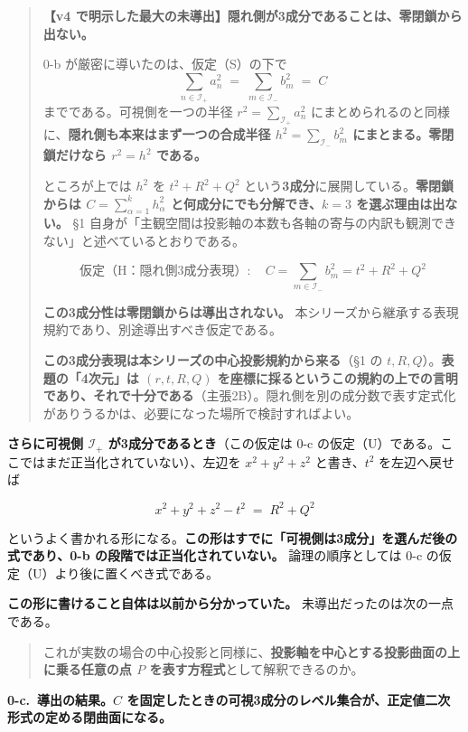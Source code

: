 \documentclass[
  10pt,
]{ltjsarticle}
\begin{document}
\begin{quote}
\textbf{【v4
で明示した最大の未導出】隠れ側が3成分であることは、零閉鎖から出ない。}

0-b が厳密に導いたのは、仮定（S）の下で
\[\sum_{n\in\mathcal{I}_+}a_n^2 \;=\; \sum_{m\in\mathcal{I}_-}b_m^2 \;=\; C\]
までである。可視側を一つの半径 \(r^2 = \sum_{\mathcal{I}_+}a_n^2\)
にまとめられるのと同様に、\textbf{隠れ側も本来はまず一つの合成半径
\(h^2 = \sum_{\mathcal{I}_-}b_m^2\) にまとまる。零閉鎖だけなら
\(r^2 = h^2\) である。}

ところが上では \(h^2\) を \(t^2+R^2+Q^2\)
という\textbf{3成分}に展開している。\textbf{零閉鎖からは
\(C = \sum_{\alpha=1}^{k}h_\alpha^2\) と何成分にでも分解でき、\(k=3\)
を選ぶ理由は出ない。} §1
自身が「主観空間は投影軸の本数も各軸の寄与の内訳も観測できない」と述べているとおりである。

\[\text{仮定（H：隠れ側3成分表現）}:\quad C = \sum_{m\in\mathcal{I}_-}b_m^2 = t^2 + R^2 + Q^2\]

\textbf{この3成分性は零閉鎖からは導出されない。}
本シリーズから継承する表現規約であり、別途導出すべき仮定である。

\textbf{この3成分表現は本シリーズの中心投影規約から来る}（§1 の
\(t, R, Q\)）。\textbf{表題の「4次元」は \((r,t,R,Q)\)
を座標に採るというこの規約の上での言明であり、それで十分である}（主張2B）。隠れ側を別の成分数で表す定式化がありうるかは、必要になった場所で検討すればよい。
\end{quote}

\textbf{さらに可視側 \(\mathcal{I}_+\) が3成分であるとき}（この仮定は
0-c の仮定（U）である。ここではまだ正当化されていない）、左辺を
\(x^2+y^2+z^2\) と書き、\(t^2\) を左辺へ戻せば

\[x^2 + y^2 + z^2 - t^2 \;=\; R^2 + Q^2\]

というよく書かれる形になる。\textbf{この形はすでに「可視側は3成分」を選んだ後の式であり、0-b
の段階では正当化されていない。} 論理の順序としては 0-c
の仮定（U）より後に置くべき式である。

\textbf{この形に書けること自体は以前から分かっていた。}
未導出だったのは次の一点である。

\begin{quote}
これが実数の場合の中心投影と同様に、\textbf{投影軸を中心とする投影曲面の上に乗る任意の点
\(P\) を表す方程式}として解釈できるのか。
\end{quote}

\textbf{0-c.~導出の結果。\(C\)
を固定したときの可視3成分のレベル集合が、正定値二次形式の定める閉曲面になる。}
\end{document}
